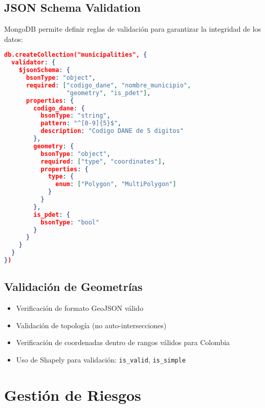 \documentclass[12pt,a4paper]{article}
\begin{document}
\subsection{JSON Schema Validation}

MongoDB permite definir reglas de validación para garantizar la integridad de los datos:

\begin{lstlisting}[language=json,basicstyle=\tiny\ttfamily,breaklines=true]
db.createCollection("municipalities", {
  validator: {
    $jsonSchema: {
      bsonType: "object",
      required: ["codigo_dane", "nombre_municipio", 
                 "geometry", "is_pdet"],
      properties: {
        codigo_dane: {
          bsonType: "string",
          pattern: "^[0-9]{5}$",
          description: "Codigo DANE de 5 digitos"
        },
        geometry: {
          bsonType: "object",
          required: ["type", "coordinates"],
          properties: {
            type: {
              enum: ["Polygon", "MultiPolygon"]
            }
          }
        },
        is_pdet: {
          bsonType: "bool"
        }
      }
    }
  }
})
\end{lstlisting}

\subsection{Validación de Geometrías}

\begin{itemize}[leftmargin=*]
    \item Verificación de formato GeoJSON válido
    \item Validación de topología (no auto-intersecciones)
    \item Verificación de coordenadas dentro de rangos válidos para Colombia
    \item Uso de Shapely para validación: \texttt{is\_valid}, \texttt{is\_simple}
\end{itemize}

\newpage
\section{Gestión de Riesgos}
\end{document}
